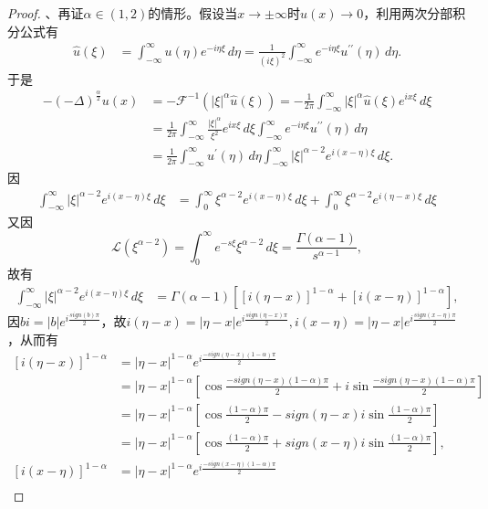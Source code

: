 \begin{proof}
、再证$\alpha\in(1,2)$的情形。假设当$x\to\pm\infty$时$u(x)\to0$，利用两次分部积分公式有
$$
\begin{aligned}
\hat u(\xi) &= \int_{-\infty}^\infty u(\eta) e^{-i\eta\xi}\,d\eta =\frac 1{(i\xi)^2}   \int_{-\infty}^\infty e^{-i\eta\xi}u^{\prime\prime}(\eta) \,d\eta.
\end{aligned}
$$
于是
$$
\begin{aligned}
-(-\Delta)^{\frac\alpha2}u(x)&=-\mathcal F^{-1}(|\xi|^\alpha\hat u(\xi))=-\frac1{2\pi} \int_{-\infty}^\infty |\xi|^\alpha\hat u(\xi) e^{ix\xi}\,d\xi\\
&=\frac1{2\pi} \int_{-\infty}^\infty \frac{|\xi|^\alpha}{\xi^2}   e^{ix\xi}\,d\xi \int_{-\infty}^\infty e^{-i\eta\xi}u^{\prime\prime}(\eta) \,d\eta\\
&=\frac 1{2\pi}  \int_{-\infty}^\infty u^\prime(\eta)   \,d\eta \int_{-\infty}^\infty  |\xi|^{\alpha-2}    e^{i(x-\eta)\xi}\,d\xi.
\end{aligned}
$$
因
$$
\begin{aligned}
\int_{-\infty}^\infty |\xi|^{\alpha-2}   e^{i(x-\eta)\xi}\,d\xi &= \int_{0}^\infty \xi^{\alpha-2}   e^{i(x-\eta)\xi}\,d\xi+\int_{0}^\infty \xi^{\alpha-2}   e^{i(\eta-x)\xi}\,d\xi
\end{aligned}
$$
又因
$$
\mathcal L(\xi^{\alpha-2})=\int_0^\infty e^{-s\xi}\xi^{\alpha-2}\,d\xi=\frac{\Gamma(\alpha-1)}{s^{\alpha-1}}, 
$$
故有
$$
\begin{aligned}
\int_{-\infty}^\infty|\xi|^{\alpha-2}   e^{i(x-\eta)\xi}\,d\xi  
&= \Gamma(\alpha-1)\left[[i(\eta-x)]^{1-\alpha} + [i(x-\eta)]^{1-\alpha}\right],
\end{aligned}
$$
因$bi=|b|e^{i\frac{sign(b) \pi}2}$，故$i(\eta-x)=|\eta-x|e^{ i\frac{sign(\eta-x)\pi}2}, i(x-\eta)=|\eta-x|e^{i\frac{sign(x-\eta)\pi}2}$，从而有
$$
\begin{aligned} 
\left[i(\eta-x)\right]^{1-\alpha}&=|\eta-x|^{1-\alpha} e^{i\frac{-sign(\eta-x)(1-\alpha)\pi}2}\\
&=|\eta-x|^{1-\alpha}\left[ \cos \frac{-sign(\eta-x)(1-\alpha)\pi}2+i\sin \frac{-sign(\eta-x)(1-\alpha)\pi}2 \right] \\
&=|\eta-x|^{1-\alpha}\left[ \cos \frac{(1-\alpha)\pi}2-sign(\eta-x)i\sin \frac{(1-\alpha)\pi}2 \right]\\
&=|\eta-x|^{1-\alpha}\left[ \cos \frac{(1-\alpha)\pi}2+sign(x-\eta)i\sin \frac{(1-\alpha)\pi}2 \right], \\
\left[i(x-\eta)\right]^{1-\alpha}&=|\eta-x|^{1-\alpha}e^{i\frac{-sign(x-\eta)(1-\alpha)\pi}2}\\

\end{aligned}$$
\end{proof}
